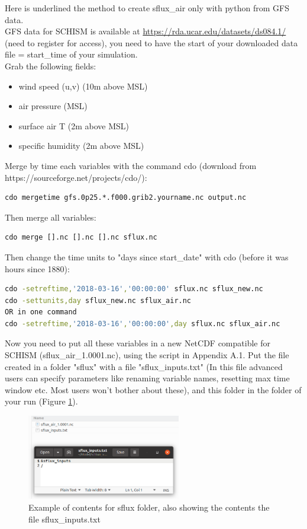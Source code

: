 \documentclass[preprints,briefreport,accept,oneauthor,pdftex]{Definitions/mdpi}
\begin{document}
\noindent Here is underlined the method to create sflux\_air only with python from GFS data.\\
GFS data for SCHISM is available at \url{https://rda.ucar.edu/datasets/ds084.1/} (need to register for access), you need to have the start of your downloaded data file = start\_time of your simulation.\\
Grab the following fields:
\begin{itemize}
    \item wind speed (u,v) (10m above MSL)
    \item air pressure (MSL)
    \item surface air T (2m above MSL)
    \item specific humidity (2m above MSL)
\end{itemize}
Merge by time each variables with the command cdo (download from https://sourceforge.net/projects/cdo/):
\begin{lstlisting}
cdo mergetime gfs.0p25.*.f000.grib2.yourname.nc output.nc
\end{lstlisting}
Then merge all variables: 
\begin{lstlisting}
cdo merge [].nc [].nc [].nc sflux.nc
\end{lstlisting}
Then change the time units to "days since start\_date" with cdo  (before it was hours since 1880):
\begin{lstlisting}[language=bash]
cdo -setreftime,'2018-03-16','00:00:00' sflux.nc sflux_new.nc 
cdo -settunits,day sflux_new.nc sflux_air.nc 
OR in one command
cdo -setreftime,'2018-03-16','00:00:00',day sflux.nc sflux_air.nc 
\end{lstlisting}
Now you need to put all these variables in a new NetCDF compatible for SCHISM (sflux\_air\_1.0001.nc), using the script in Appendix A.1.
Put the file created in a folder "sflux" with a file "sflux\_inputs.txt" (In this file advanced users can specify parameters like renaming variable names, resetting max time window etc. Most users won't bother about these), and this folder in the folder of your run (Figure \ref{fig:sflux}).\begin{figure}[hbtp]
    \centering
    \includegraphics[width=0.6\textwidth]{figures/sflux.png}
    \caption{Example of contents for sflux folder, also showing the contents the file sflux\_inputs.txt}
    \label{fig:sflux}
\end{figure} \newline
\end{document}

